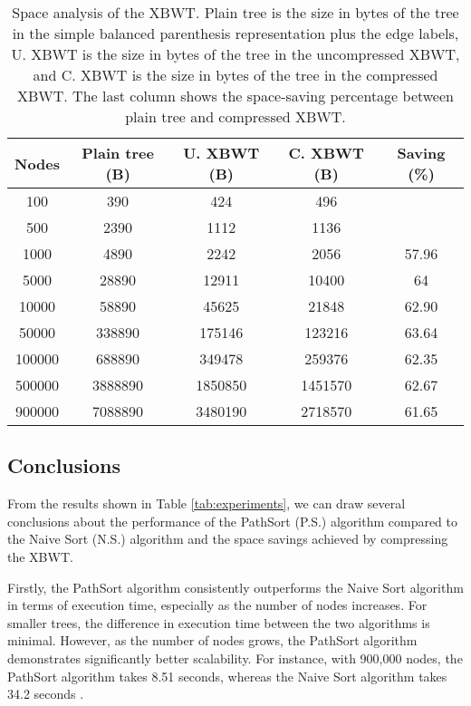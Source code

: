 \begin{table}[ht]
    \centering
    \begin{tabular}{|c|c|c|c|c|}
        \hline
        \textbf{Nodes} & \textbf{Plain tree (B)} & \textbf{U. XBWT (B)} & \textbf{C. XBWT (B)} & \textbf{Saving (\%)} \\
        \hline
        100 & 390 & 424 & 496 \color{gray}{(-27.18\%)} &  \\
        500 & 2390 & 1112 & 1136 \color{gray}{(52.47\%)} &  \\
        1000 & 4890 & 2242 & 2056 & 57.96 \\
        5000 & 28890 & 12911 & 10400 & 64 \\
        10000 & 58890 & 45625 & 21848 & 62.90 \\
        50000 & 338890 & 175146 & 123216 & 63.64 \\
        100000 & 688890 & 349478 & 259376 & 62.35 \\
        500000 & 3888890 & 1850850 & 1451570 & 62.67 \\
        900000 & 7088890 & 3480190 & 2718570 & 61.65 \\
        \hline
    \end{tabular}
    \caption{Space analysis of the XBWT. Plain tree is the size in bytes of the tree in the simple balanced parenthesis representation plus the edge labels, U. XBWT is the size in bytes of the tree in the uncompressed XBWT, and C. XBWT is the size in bytes of the tree in the compressed XBWT. The last column shows the space-saving percentage between plain tree and compressed XBWT.}
    \label{tab:experiments_2}
\end{table}

\subsection{Conclusions}
From the results shown in Table \cref{tab:experiments}, we can draw several conclusions about the performance of the PathSort (P.S.) algorithm compared to the Naive Sort (N.S.) algorithm and the space savings achieved by compressing the XBWT.

Firstly, the PathSort algorithm consistently outperforms the Naive Sort algorithm in terms of execution time, especially as the number of nodes increases. For smaller trees, the difference in execution time between the two algorithms is minimal. However, as the number of nodes grows, the PathSort algorithm demonstrates significantly better scalability. For instance, with 900,000 nodes, the PathSort algorithm takes 8.51 seconds, whereas the Naive Sort algorithm takes 34.2 seconds .

